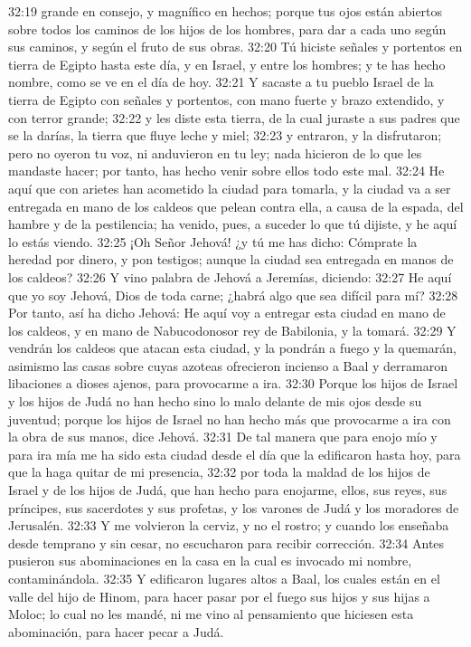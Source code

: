 32:19 grande en consejo, y magnífico en hechos; porque tus ojos están abiertos sobre todos los caminos de los hijos de los hombres, para dar a cada uno según sus caminos, y según el fruto de sus obras. 
32:20 Tú hiciste señales y portentos en tierra de Egipto hasta este día, y en Israel, y entre los hombres; y te has hecho nombre, como se ve en el día de hoy. 
32:21 Y sacaste a tu pueblo Israel de la tierra de Egipto con señales y portentos, con mano fuerte y brazo extendido, y con terror grande; 
32:22 y les diste esta tierra, de la cual juraste a sus padres que se la darías, la tierra que fluye leche y miel; 
32:23 y entraron, y la disfrutaron; pero no oyeron tu voz, ni anduvieron en tu ley; nada hicieron de lo que les mandaste hacer; por tanto, has hecho venir sobre ellos todo este mal. 
32:24 He aquí que con arietes han acometido la ciudad para tomarla, y la ciudad va a ser entregada en mano de los caldeos que pelean contra ella, a causa de la espada, del hambre y de la pestilencia; ha venido, pues, a suceder lo que tú dijiste, y he aquí lo estás viendo. 
32:25 ¡Oh Señor Jehová! ¿y tú me has dicho: Cómprate la heredad por dinero, y pon testigos; aunque la ciudad sea entregada en manos de los caldeos? 
32:26 Y vino palabra de Jehová a Jeremías, diciendo: 
32:27 He aquí que yo soy Jehová, Dios de toda carne; ¿habrá algo que sea difícil para mí? 
32:28 Por tanto, así ha dicho Jehová: He aquí voy a entregar esta ciudad en mano de los caldeos, y en mano de Nabucodonosor rey de Babilonia, y la tomará. 
32:29 Y vendrán los caldeos que atacan esta ciudad, y la pondrán a fuego y la quemarán, asimismo las casas sobre cuyas azoteas ofrecieron incienso a Baal y derramaron libaciones a dioses ajenos, para provocarme a ira. 
32:30 Porque los hijos de Israel y los hijos de Judá no han hecho sino lo malo delante de mis ojos desde su juventud; porque los hijos de Israel no han hecho más que provocarme a ira con la obra de sus manos, dice Jehová. 
32:31 De tal manera que para enojo mío y para ira mía me ha sido esta ciudad desde el día que la edificaron hasta hoy, para que la haga quitar de mi presencia, 
32:32 por toda la maldad de los hijos de Israel y de los hijos de Judá, que han hecho para enojarme, ellos, sus reyes, sus príncipes, sus sacerdotes y sus profetas, y los varones de Judá y los moradores de Jerusalén. 
32:33 Y me volvieron la cerviz, y no el rostro; y cuando los enseñaba desde temprano y sin cesar, no escucharon para recibir corrección. 
32:34 Antes pusieron sus abominaciones en la casa en la cual es invocado mi nombre, contaminándola. 
32:35 Y edificaron lugares altos a Baal, los cuales están en el valle del hijo de Hinom,   para hacer pasar por el fuego sus hijos y sus hijas a Moloc; lo cual no les mandé, ni me vino al pensamiento que hiciesen esta abominación, para hacer pecar a Judá. 
